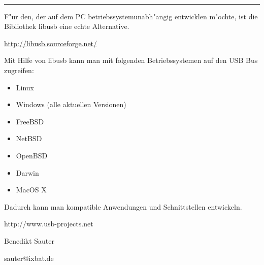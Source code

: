 \documentclass[11pt]{article}
\begin{document}
\begin{minipage}[t]{7cm}
\hfill {\Large{}}\\
\hrule

\medskip


F"ur den, der auf dem PC betriebssystemunabh"angig entwicklen m"ochte,
ist die Bibliothek libusb eine echte Alternative.
	
\begin{center}
      \url{http://libusb.sourceforge.net/}
\end{center}

Mit Hilfe von libusb kann man mit folgenden
Betriebssystemen auf den USB Bus zugreifen:

\begin{itemize}
	\item Linux
	\item Windows (alle aktuellen Versionen)
	\item FreeBSD
	\item NetBSD
	\item OpenBSD
	\item Darwin
	\item MacOS X
\end{itemize}

Dadurch kann man kompatible Anwendungen und Schnittstellen
entwickeln.


\bigskip
{}

\medskip

http://www.usb-projects.net

Benedikt Sauter

sauter@ixbat.de


\end{minipage}
\hskip 12mm
\end{document}
